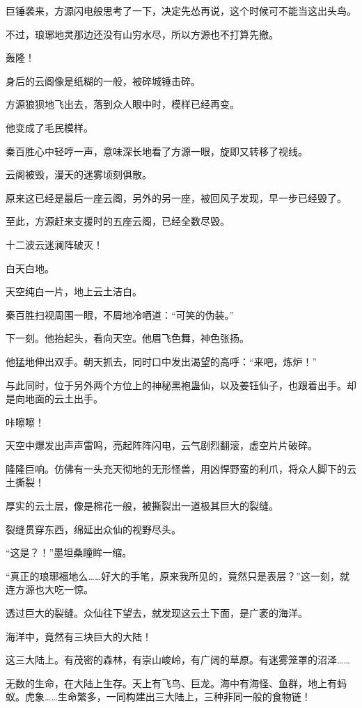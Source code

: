 \begin{this_body}
巨锤袭来，方源闪电般思考了一下，决定先怂再说，这个时候可不能当这出头鸟。

不过，琅琊地灵那边还没有山穷水尽，所以方源也不打算先撤。

轰隆！

身后的云阁像是纸糊的一般，被碎城锤击碎。

方源狼狈地飞出去，落到众人眼中时，模样已经再变。

他变成了毛民模样。

秦百胜心中轻哼一声，意味深长地看了方源一眼，旋即又转移了视线。

云阁被毁，漫天的迷雾顷刻俱散。

原来这已经是最后一座云阁，另外的另一座，被回风子发现，早一步已经毁了。

至此，方源赶来支援时的五座云阁，已经全数尽毁。

十二波云迷澜阵破灭！

白天白地。

天空纯白一片，地上云土洁白。

秦百胜扫视周围一眼，不屑地冷哂道：“可笑的伪装。”

下一刻。他抬起头，看向天空。他眉飞色舞，神色张扬。

他猛地伸出双手。朝天抓去，同时口中发出渴望的高呼：“来吧，炼炉！”

与此同时，位于另外两个方位上的神秘黑袍蛊仙，以及姜钰仙子，也跟着出手。却是向地面的云土出手。

咔嚓嚓！

天空中爆发出声声雷鸣，亮起阵阵闪电，云气剧烈翻滚，虚空片片破碎。

隆隆巨响。仿佛有一头充天彻地的无形怪兽，用凶悍野蛮的利爪，将众人脚下的云土撕裂！

厚实的云土层，像是棉花一般，被撕裂出一道极其巨大的裂缝。

裂缝贯穿东西，绵延出众仙的视野尽头。

“这是？！”墨坦桑瞳眸一缩。

“真正的琅琊福地么……好大的手笔，原来我所见的，竟然只是表层？”这一刻，就连方源也大吃一惊。

透过巨大的裂缝。众仙往下望去，就发现这云土下面，是广袤的海洋。

海洋中，竟然有三块巨大的大陆！

这三大陆上。有茂密的森林，有崇山峻岭，有广阔的草原。有迷雾笼罩的沼泽……

无数的生命，在大陆上生存。天上有飞鸟、巨龙。海中有海怪、鱼群，地上有蚂蚁。虎象……生命繁多，一同构建出三大陆上，三种非同一般的食物链！


\end{this_body}

